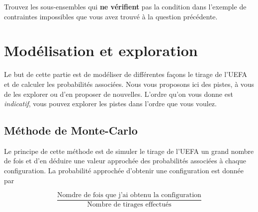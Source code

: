 \documentclass{../ficheTDTP}
\begin{document}
\begin{enumerate}
\begin{enumerate}
Trouvez les sous-ensembles qui \textbf{ne vérifient} pas la condition dans l'exemple de contraintes impossibles que vous avez trouvé à la question précédente.
\end{enumerate} 
\end{enumerate}




\section{Modélisation et exploration}

Le but de cette partie est de modéliser de différentes façons le tirage de l'UEFA et de calculer les probabilités associées. Nous vous proposons ici des pistes, à vous de les explorer ou d'en proposer de nouvelles. L'ordre qu'on vous donne est \textit{indicatif}, vous pouvez explorer les pistes dans l'ordre que vous voulez. 

\subsection{Méthode de Monte-Carlo}

Le principe de cette méthode est de simuler le tirage de l'UEFA un grand nombre de fois et d'en déduire une valeur approchée des probabilités associées à chaque configuration. La probabilité approchée d'obtenir une configuration est donnée par 

\begin{equation*}
\frac{\text{Nomdre de fois que j'ai obtenu la configuration}}{\text{Nombre de tirages effectués}}
\end{equation*}
\end{document}
